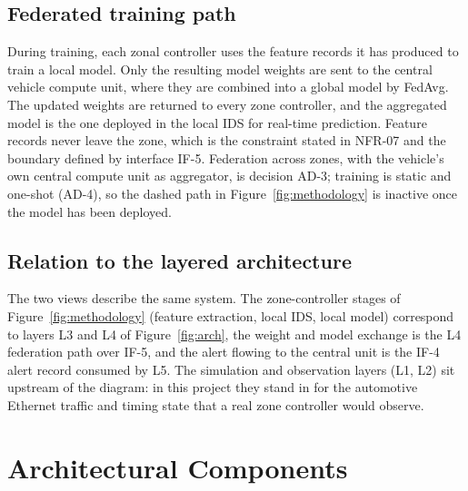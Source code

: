\subsection*{Federated training path}

During training, each zonal controller uses the feature records it has produced to train
a local model. Only the resulting model weights are sent to the central vehicle compute
unit, where they are combined into a global model by FedAvg. The updated weights are
returned to every zone controller, and the aggregated model is the one deployed in the
local IDS for real-time prediction. Feature records never leave the zone, which is the
constraint stated in NFR-07 and the boundary defined by interface IF-5. Federation
across zones, with the vehicle's own central compute unit as aggregator, is decision
AD-3; training is static and one-shot (AD-4), so the dashed path in
Figure~\ref{fig:methodology} is inactive once the model has been deployed.

\subsection*{Relation to the layered architecture}

The two views describe the same system. The zone-controller stages of
Figure~\ref{fig:methodology} (feature extraction, local IDS, local model) correspond to
layers L3 and L4 of Figure~\ref{fig:arch}, the weight and model exchange is the L4
federation path over IF-5, and the alert flowing to the central unit is the IF-4 alert
record consumed by L5. The simulation and observation layers (L1, L2) sit upstream of
the diagram: in this project they stand in for the automotive Ethernet traffic and
timing state that a real zone controller would observe.

\section{Architectural Components}
\label{sec:components}


